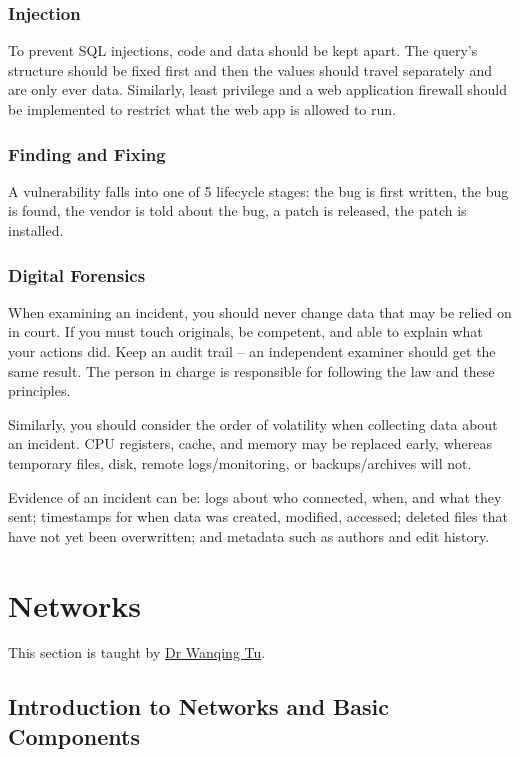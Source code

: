 \subsubsection{Injection}

To prevent SQL injections, code and data should be kept apart.
The query's structure should be fixed first and then the values should travel separately and are only ever data.
Similarly, least privilege and a web application firewall should be implemented to restrict what the web app is allowed to run.

\subsubsection{Finding and Fixing}

A vulnerability falls into one of 5 lifecycle stages: the bug is first written, the bug is found, the vendor is told about the bug, a patch is released, the patch is installed.

\subsubsection{Digital Forensics}

When examining an incident, you should never change data that may be relied on in court.
If you must touch originals, be competent, and able to explain what your actions did.
Keep an audit trail -- an independent examiner should get the same result.
The person in charge is responsible for following the law and these principles.

Similarly, you should consider the order of volatility when collecting data about an incident.
CPU registers, cache, and memory may be replaced early, whereas temporary files, disk, remote logs/monitoring, or backups/archives will not.

Evidence of an incident can be: 
logs about who connected, when, and what they sent;
timestamps for when data was created, modified, accessed;
deleted files that have not yet been overwritten;
and metadata such as authors and edit history.

\newpage\section{Networks}

This section is taught by \hyperref[modulelead-wanqingtu]{Dr Wanqing Tu}. 

\subsection{Introduction to Networks and Basic Components}

